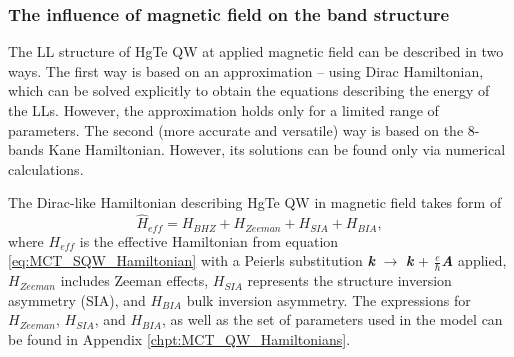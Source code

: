 \documentclass[titlepage,a4paper]{book}
\newcommand{\wciecie}{\quad\phantom{v}}
\begin{document}
\subsubsection{The influence of magnetic field on the band structure}
\wciecie
The LL structure of HgTe QW at applied magnetic field can be described in two ways. The first way is based on an approximation -- using Dirac Hamiltonian, which can be solved explicitly to obtain the equations describing the energy of the LLs. However, the approximation holds only for a limited range of parameters. The second (more accurate and versatile) way is based on the 8-bands Kane Hamiltonian. However, its solutions can be found only via numerical calculations.

The Dirac-like Hamiltonian describing HgTe QW in magnetic field takes form of
\begin{equation}
\label{eq:MCT_SQW_MagneticField}
\hat H_{eff} = H_{BHZ} + H_{Zeeman} + H_{SIA} + H_{BIA} ,
\end{equation}
where $H_{eff}$ is the effective Hamiltonian from equation \ref{eq:MCT_SQW_Hamiltonian} with a Peierls substitution \textbf{\textit{k}} $\rightarrow$ \textbf{\textit{k}} + $\frac{e}{\hbar}$\textbf{\textit{A}} applied, $H_{Zeeman}$ includes Zeeman effects, $H_{SIA}$ represents the structure inversion asymmetry (SIA), and $H_{BIA}$ bulk inversion asymmetry. The expressions for $H_{Zeeman}$, $H_{SIA}$, and $H_{BIA}$, as well as the set of parameters used in the model can be found in Appendix \ref{chpt:MCT_QW_Hamiltonians}.
\end{document}
